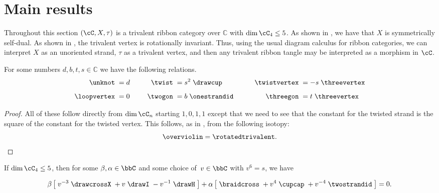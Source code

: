 \documentclass[12pt]{amsart}
\begin{document}
\section{Main results}

Throughout this section $(\cC, X, \tau)$ is a trivalent ribbon category over
$\mathbb{C}$ with $\dim{\cC_4} \leq 5$.  As shown in \cite[Lemma
2.2]{MR3624901}, we have that $X$ is symmetrically self-dual.  As shown in
\cite[Lemma 8.2]{MR3624901}, the trivalent vertex is rotationally invariant.
Thus, using the usual diagram calculus for ribbon categories, we can interpret
$X$ as an unoriented strand, $\tau$ as a trivalent vertex, and then any
trivalent ribbon tangle may be interpreted as a morphism in $\cC$.

\begin{lemma} \label{lem:constants}
  For some numbers $d, b, t, s \in \mathbb{C}$ we have the following relations.
  \begin{equation}
    \label{eq:simple-rels}
  \begin{aligned}
    \unknot\; &= d&\qquad
      \twist\; &= s^2\;\drawcup&\qquad
        \twistvertex\; &= -s\;\threevertex\\[5pt]
    \loopvertex\;&=0&
      \twogon\;&= b\;\onestrandid&
        \threegon\; &= t\;\threevertex
  \end{aligned}
  \end{equation}
\end{lemma}

\begin{proof}
All of these follow directly from $\dim \cC_n$ starting $1,0,1,1$ except that
we need to see that the constant for the twisted strand is the square of the
constant for the twisted vertex.  This follows, as in
\cite[Lemma~8.2]{MR3624901}, from the following isotopy:
\begin{equation*}
\overviolin = \rotatedtrivalent. \qedhere
\end{equation*}
\end{proof}

\begin{proposition}\label{prop:Jacobi}
If $\dim \cC_4 \leq 5$, then for some $\beta, \alpha \in \bbC$ and some choice
of~$v \in \bbC$ with $v^6 = s$, we have

\begin{equation}
\beta \left[\; v^{-3} \;
\drawcrossX
\;+ v \;
\drawI
\; -v^{-1} \;
 \drawH
\;\right]
 + \alpha
\left[\; \braidcross \;
 + v^{4}\;
\cupcap
\; + v^{-4} \;
 \twostrandid \;
 \right] = 0.\label{eq:quant-except-init}
 \end{equation}
\end{proposition}
\end{document}
